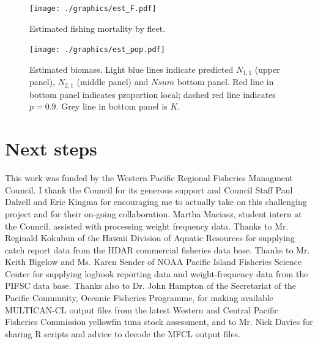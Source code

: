 \documentclass[12pt,letterpaper]{article}
\newcommand\None{{N_{1,1}}}
\newcommand\Ntwo{{N_{2,1}}}
\begin{document}
\begin{figure}
\begin{center}
\texttt{[image: ./graphics/est\_F.pdf]}
\caption{\label{fig:estF}
Estimated fishing mortality by fleet.
}
\end{center}
\end{figure}

\begin{figure}
\begin{center}
\texttt{[image: ./graphics/est\_pop.pdf]}
\caption{\label{fig:estB}
Estimated biomass. Light blue lines indicate predicted $\None$ (upper
panel), $\Ntwo$ (middle panel) and $Nsum$ bottom panel. Red line in
bottom panel indicates proportion local; dashed red line indicates
$p=0.9$. Grey line in bottom panel is $K$.
}
\end{center}
\end{figure}

\section*{Next steps}

\vspace{4ex}
This work was funded by the Western Pacific Regional Fisheries
Managment Council. I thank the Council for its generous support and
Council Staff Paul Dalzell and Eric Kingma for encouraging me to
actually take on this challenging project and for their on-going
collaboration.
Martha Maciasz, student intern at the Council, assisted with
processing weight frequency data.
Thanks to Mr. Reginald Kokubun of the Hawaii Division of Aquatic
Resources for supplying catch report data from the HDAR commercial
fisheries data base.
Thanks to Mr. Keith Bigelow and Ms. Karen Sender of NOAA Pacific
Island Fisheries Science Center for supplying logbook reporting data and
weight-frequency data from the PIFSC data base.
Thanks also to Dr. John Hampton of the Secretariat of the Pacific
Community, Oceanic Fisheries Programme, for making available
MULTICAN-CL output files from the latest Western and Central Pacific
Fisheries Commission yellowfin tuna stock assessment, and to Mr. Nick
Davies for sharing R scripts and advice to decode the MFCL output files.
\end{document}
